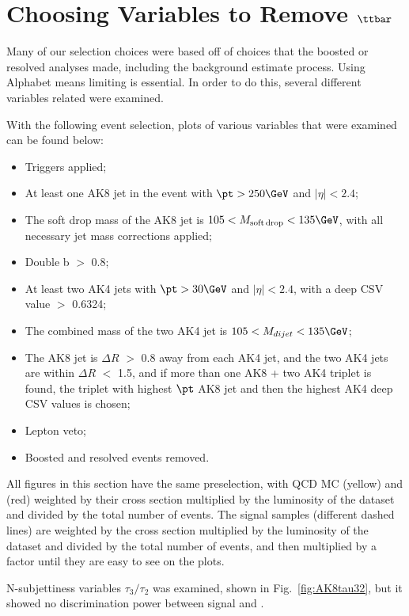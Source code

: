 \section{Choosing Variables to Remove \texorpdfstring{$\ttbar$}{ttbar}\label{app:AK4variables}}

Many of our selection choices were based off of choices that the boosted or resolved analyses made, including the background estimate process. Using Alphabet means limiting \ttbar is essential. In order to do this, several different variables related were examined.

With the following event selection, plots of various variables that were examined can be found below:
\begin{itemize}
  \item Triggers applied;
 \item At least one AK8 jet in the event with $\pt > 250\GeV$ and $|\eta| < 2.4$;
\item The soft drop mass of the AK8 jet is $105 < M_{\rm soft\,drop} < 135\GeV$, with all necessary jet mass corrections applied;
\item Double b $>$ 0.8;
 \item At least two AK4 jets with $\pt > 30\GeV$ and $|\eta| < 2.4$, with a deep CSV value $>$ 0.6324;
\item The combined mass of the two AK4 jet is $105 < M_{dijet} < 135\GeV$;
 \item The AK8 jet is $\Delta R$ $>$ 0.8 away from each AK4 jet, and the two AK4 jets are within $\Delta R$ $<$ 1.5,
       and if more than one AK8 + two AK4 triplet is found, the triplet with highest $\pt$ AK8 jet and then the highest AK4 deep CSV values is chosen;
 \item Lepton veto;
 \item Boosted and resolved events removed.
\end{itemize}

All figures in this section have the same preselection, with QCD MC (yellow) and \ttbar (red) weighted by their cross section multiplied by the luminosity of the dataset and divided by the total number of events. The signal samples (different dashed lines) are weighted by the cross section multiplied by the luminosity of the dataset and divided by the total number of events, and then multiplied by a factor until they are easy to see on the plots. 

N-subjettiness variables $\tau_{3}/\tau_{2}$ was examined, shown in Fig.~\ref{fig:AK8tau32}, but it showed no discrimination power between signal and \ttbar.

